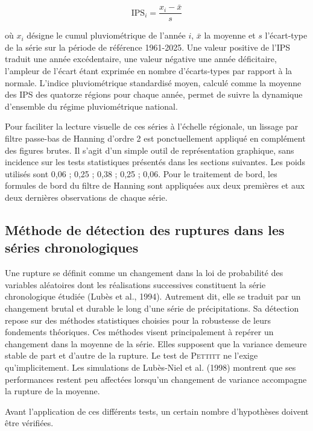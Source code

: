 \documentclass[12pt,a4paper]{report}
\begin{document}
\begin{formulabox}[0.40\linewidth]{}
\[
\mathrm{IPS}_i = \frac{x_i-\bar{x}}{s}
\]
\end{formulabox}

\noindent où $x_i$ désigne le cumul pluviométrique de l'année $i$, $\bar{x}$ la moyenne et $s$ l'écart-type de la série sur la période de référence 1961-2025. Une valeur positive de l'IPS traduit une année excédentaire, une valeur négative une année déficitaire, l'ampleur de l'écart étant exprimée en nombre d'écarts-types par rapport à la normale. L'indice pluviométrique standardisé moyen, calculé comme la moyenne des IPS des quatorze régions pour chaque année, permet de suivre la dynamique d'ensemble du régime pluviométrique national.

Pour faciliter la lecture visuelle de ces séries à l’échelle régionale, un lissage par filtre passe-bas de Hanning d’ordre 2 est ponctuellement appliqué en complément des figures brutes. Il s’agit d’un simple outil de représentation graphique, sans incidence sur les tests statistiques présentés dans les sections suivantes. Les poids utilisés sont 0,06 ; 0,25 ; 0,38 ; 0,25 ; 0,06. Pour le traitement de bord, les formules de bord du filtre de Hanning sont appliquées aux deux premières et aux deux dernières observations de chaque série.

\subsection{Méthode de détection des ruptures dans les séries chronologiques}

Une rupture se définit comme un changement dans la loi de probabilité des variables aléatoires dont les réalisations successives constituent la série chronologique étudiée (Lubès et al., 1994). Autrement dit, elle se traduit par un changement brutal et durable le long d'une série de précipitations. Sa détection repose sur des méthodes statistiques choisies pour la robustesse de leurs fondements théoriques. Ces méthodes visent principalement à repérer un changement dans la moyenne de la série. Elles supposent que la variance demeure stable de part et d'autre de la rupture. Le test de \textsc{Pettitt} ne l'exige qu'implicitement. Les simulations de Lubès-Niel et al. (1998) montrent que ses performances restent peu affectées lorsqu’un changement de variance accompagne la rupture de la moyenne.

Avant l'application de ces différents tests, un certain nombre d'hypothèses doivent être vérifiées.
\end{document}
